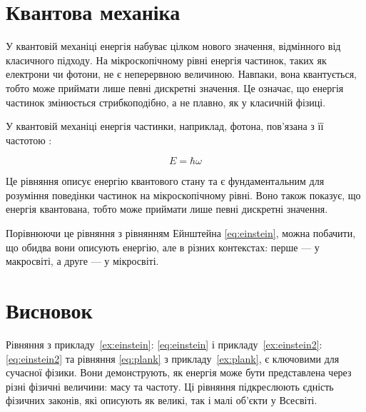 \section{Квантова механіка}


У квантовій механіці енергія набуває цілком нового значення, відмінного від класичного підходу. На
мікроскопічному рівні енергія частинок, таких як електрони чи фотони, не є неперервною величиною.
Навпаки, вона квантується, тобто може приймати лише певні дискретні значення. Це означає, що енергія
частинок змінюється стрибкоподібно, а не плавно, як у класичній фізиці.

\begin{Example}\label{ex:plank}
	У квантовій механіці енергія частинки, наприклад, фотона, пов'язана з її частотою :

	\begin{equation}\label{eq:plank}
		E = \hbar\omega
	\end{equation}

	Це рівняння описує енергію квантового стану та є фундаментальним для розуміння поведінки
	частинок на мікроскопічному рівні. Воно також показує, що енергія квантована, тобто може
	приймати лише певні дискретні значення.

	Порівнюючи це рівняння з рівнянням Ейнштейна \eqref{eq:einstein}, можна побачити, що обидва
	вони описують енергію, але в різних контекстах: перше — у макросвіті, а друге — у мікросвіті.
\end{Example}

\section{Висновок}

Рівняння з прикладу~\ref{ex:einstein}: \eqref{eq:einstein} і прикладу~\ref{ex:einstein2}:
\eqref{eq:einstein2} та рівняння \ref{eq:plank} з
прикладу~\ref{ex:plank}, є ключовими для сучасної фізики. Вони
демонструють, як енергія може бути представлена через різні фізичні величини: масу та частоту.
Ці рівняння підкреслюють єдність фізичних законів, які описують як великі, так і малі об'єкти у
Всесвіті.



